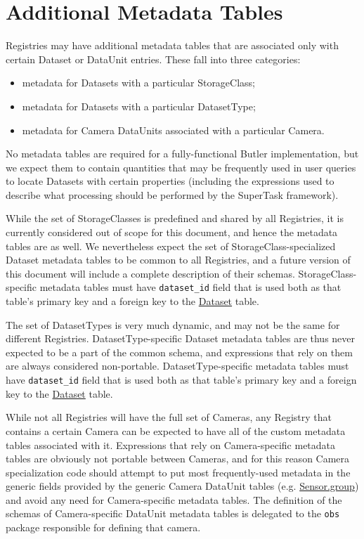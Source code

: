 \documentclass[DM,toc]{lsstdoc}
\newcommand{\tblref}[1]{\hyperref[tbl:#1]{#1}}
\begin{document}
\section{Additional Metadata Tables}
\label{sec:metadata}

Registries may have additional metadata tables that are associated only with certain Dataset or DataUnit entries.
These fall into three categories:
\begin{itemize}
    \item metadata for Datasets with a particular StorageClass;
    \item metadata for Datasets with a particular DatasetType;
    \item metadata for Camera DataUnits associated with a particular Camera.
\end{itemize}
No metadata tables are required for a fully-functional Butler implementation, but we expect them to contain quantities that may be frequently used in user queries to locate Datasets with certain properties (including the expressions used to describe what processing should be performed by the SuperTask framework).

While the set of StorageClasses is predefined and shared by all Registries, it is currently considered out of scope for this document, and hence the metadata tables are as well.
We nevertheless expect the set of StorageClass-specialized Dataset metadata tables to be common to all Registries, and a future version of this document will include a complete description of their schemas.
StorageClass-specific metadata tables must have \texttt{dataset\_id} field that is used both as that table's primary key and a foreign key to the \tblref{Dataset} table.

The set of DatasetTypes is very much dynamic, and may not be the same for different Registries.
DatasetType-specific Dataset metadata tables are thus never expected to be a part of the common schema, and expressions that rely on them are always considered non-portable.
DatasetType-specific metadata tables must have \texttt{dataset\_id} field that is used both as that table's primary key and a foreign key to the \tblref{Dataset} table.

While not all Registries will have the full set of Cameras, any Registry that contains a certain Camera can be expected to have all of the custom metadata tables associated with it.
Expressions that rely on Camera-specific metadata tables are obviously not portable between Cameras, and for this reason Camera specialization code should attempt to put most frequently-used metadata in the generic fields provided by the generic Camera DataUnit tables (e.g. \hyperref[tbl:Sensor]{Sensor.group}) and avoid any need for Camera-specific metadata tables.
The definition of the schemas of Camera-specific DataUnit metadata tables is delegated to the \texttt{obs} package responsible for defining that camera.
\end{document}
